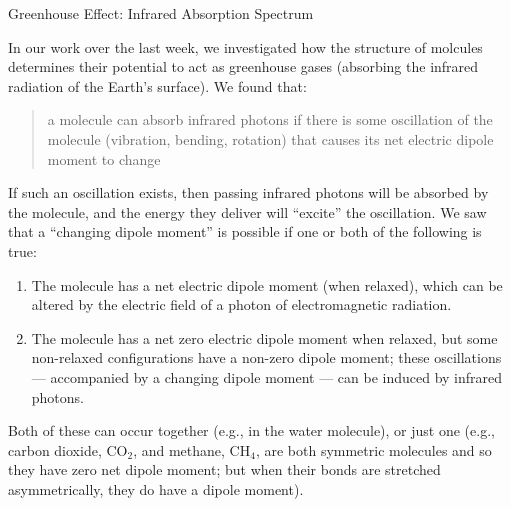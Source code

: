 \documentclass[12pt]{article}
\begin{document}
\begin{center}
{\Large Greenhouse Effect: Infrared Absorption Spectrum}
\end{center}

\noindent In our work over the last week, we investigated how the structure of molcules determines their potential to act as greenhouse gases (absorbing the infrared radiation of the Earth's surface). We found that:
	\begin{quote}
	a molecule can absorb infrared photons if there is some oscillation of the molecule (vibration, bending, rotation) that causes its net electric dipole moment to change
	\end{quote}
If such an oscillation exists, then passing infrared photons will be absorbed by the molecule, and the energy they deliver will ``excite'' the oscillation.  We saw that a ``changing dipole moment'' is possible if one or both of the following is true:
		\begin{enumerate}[label=(\roman*)]
		\item The molecule has a net electric dipole moment (when relaxed), which can be altered by the electric field of a photon of electromagnetic radiation.
		\item The molecule has a net zero electric dipole moment when relaxed, but some non-relaxed configurations have a non-zero dipole moment; these oscillations --- accompanied by a changing dipole moment --- can be induced by infrared photons.
		\end{enumerate}
	Both of these can occur together (e.g., in the water molecule), or just one (e.g., carbon dioxide, $\text{CO}_2$, and methane, $\text{CH}_4$, are both symmetric molecules and so they have zero net dipole moment; but when their bonds are stretched asymmetrically, they do have a dipole moment).\\[-6pt]
\end{document}
